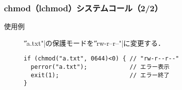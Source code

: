 \documentclass{beamer}                 %
\begin{document}
\begin{frame}[fragile]
  \frametitle{chmod（lchmod）システムコール（2/2）}
  \begin{description}
  \item[使用例] \|"a.txt"|の保護モードを\|"rw-r--r--"|に変更する．
\begin{verbatim}
if (chmod("a.txt", 0644)<0) { // "rw-r--r--"
  perror("a.txt");            // エラー表示
  exit(1);                    // エラー終了
}
\end{verbatim}

%

\end{description}
\end{frame}

%
%
%
%
\end{document}
